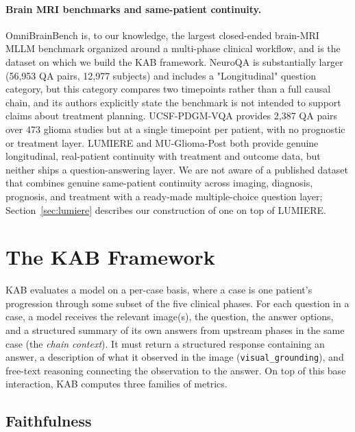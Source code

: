 \documentclass[11pt]{article}
\begin{document}
\paragraph{Brain MRI benchmarks and same-patient continuity.} OmniBrainBench \citep{peng2026omnibrainbench} is, to our knowledge, the largest closed-ended brain-MRI MLLM benchmark organized around a multi-phase clinical workflow, and is the dataset on which we build the KAB framework. NeuroQA \citep{abbasi2026neuroqa} is substantially larger (56,953 QA pairs, 12,977 subjects) and includes a "Longitudinal" question category, but this category compares two timepoints rather than a full causal chain, and its authors explicitly state the benchmark is not intended to support claims about treatment planning. UCSF-PDGM-VQA \citep{ghosh2026ucsfpdgmvqa} provides 2,387 QA pairs over 473 glioma studies but at a single timepoint per patient, with no prognostic or treatment layer. LUMIERE \citep{suter2022lumiere} and MU-Glioma-Post \citep{muglioma2025post} both provide genuine longitudinal, real-patient continuity with treatment and outcome data, but neither ships a question-answering layer. We are not aware of a published dataset that combines genuine same-patient continuity across imaging, diagnosis, prognosis, and treatment with a ready-made multiple-choice question layer; Section~\ref{sec:lumiere} describes our construction of one on top of LUMIERE.

\section{The KAB Framework}
\label{sec:kab}

KAB evaluates a model on a per-case basis, where a case is one patient's progression through some subset of the five clinical phases. For each question in a case, a model receives the relevant image(s), the question, the answer options, and a structured summary of its own answers from upstream phases in the same case (the \emph{chain context}). It must return a structured response containing an answer, a description of what it observed in the image (\texttt{visual\_grounding}), and free-text reasoning connecting the observation to the answer. On top of this base interaction, KAB computes three families of metrics.

\subsection{Faithfulness}
\label{sec:faithfulness}
\end{document}
